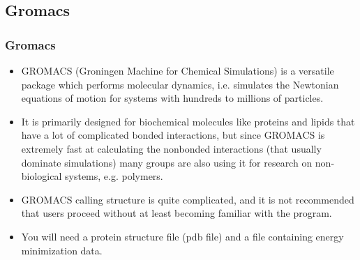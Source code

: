 \documentclass[slidestop,mathserif,compress,xcolor=svgnames]{beamer}
\begin{document}
\subsection{Gromacs}
\begin{frame}
  \frametitle{\small Gromacs}
  \begin{block}{}
    \begin{itemize}
      \item GROMACS (Groningen Machine for Chemical Simulations) is a versatile package which performs molecular dynamics, i.e. simulates the Newtonian equations of motion for systems with hundreds to millions of particles.
      \item It is primarily designed for biochemical molecules like proteins and lipids that have a lot of complicated bonded interactions, but since GROMACS is extremely fast at calculating the nonbonded interactions (that usually dominate simulations) many groups are also using it for research on non-biological systems, e.g. polymers. 
      \item GROMACS calling structure is quite complicated, and it is not recommended that users proceed without at least becoming familiar with the program.
      \item You will need a protein structure file (pdb file) and a file containing energy minimization data.
    \end{itemize}
  \end{block}
\end{frame}
\end{document}
